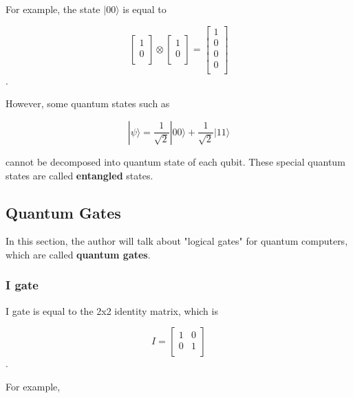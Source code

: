   For example, the state $|00\rangle$ is equal to 
  
\begin{equation}
 \left[
\begin{array}{c}
1 \\
0 \\
\end{array}
\right]
\otimes
 \left[
\begin{array}{c}
1 \\
0 \\
\end{array}
\right]
= \left[
\begin{array}{c}
1 \\
0 \\
0 \\
0 \\
\end{array}
\right]
\end{equation}.

 However, some quantum states such as
 
 \begin{equation}
 	|\psi\rangle = \frac{1}{\sqrt{2}}|00\rangle + \frac{1}{\sqrt{2}}|11\rangle
 \end{equation}
 
 cannot be decomposed into quantum state of each qubit.  These special quantum states are called \textbf{entangled} states.

\subsection{Quantum Gates}

 In this section, the author will talk about "logical gates" for quantum computers, which are called \textbf{quantum gates}.
 
\subsubsection{I gate}

I gate is equal to the 2x2 identity matrix, which is 

\begin{equation}
I = \begin{bmatrix}
1 & 0 \\
0 & 1 \\
\end{bmatrix}
\end{equation}.

For example,

